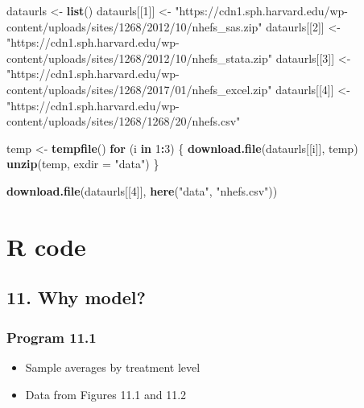 \documentclass[
  10pt,
]{book}
\newenvironment{Shaded}{\begin{snugshade}}{\end{snugshade}}
\newcommand{\ControlFlowTok}[1]{\textcolor[rgb]{0.13,0.29,0.53}{\textbf{#1}}}
\newcommand{\DataTypeTok}[1]{\textcolor[rgb]{0.13,0.29,0.53}{#1}}
\newcommand{\DecValTok}[1]{\textcolor[rgb]{0.00,0.00,0.81}{#1}}
\newcommand{\KeywordTok}[1]{\textcolor[rgb]{0.13,0.29,0.53}{\textbf{#1}}}
\newcommand{\NormalTok}[1]{#1}
\newcommand{\OperatorTok}[1]{\textcolor[rgb]{0.81,0.36,0.00}{\textbf{#1}}}
\newcommand{\StringTok}[1]{\textcolor[rgb]{0.31,0.60,0.02}{#1}}
\providecommand{\tightlist}{%
  \setlength{\itemsep}{0pt}\setlength{\parskip}{0pt}}
\begin{document}
\begin{Shaded}
\begin{Highlighting}[]
\NormalTok{dataurls <-}\StringTok{ }\KeywordTok{list}\NormalTok{()}
\NormalTok{dataurls[[}\DecValTok{1}\NormalTok{]] <-}\StringTok{ "https://cdn1.sph.harvard.edu/wp-content/uploads/sites/1268/2012/10/nhefs_sas.zip"}
\NormalTok{dataurls[[}\DecValTok{2}\NormalTok{]] <-}\StringTok{ "https://cdn1.sph.harvard.edu/wp-content/uploads/sites/1268/2012/10/nhefs_stata.zip"}
\NormalTok{dataurls[[}\DecValTok{3}\NormalTok{]] <-}\StringTok{ "https://cdn1.sph.harvard.edu/wp-content/uploads/sites/1268/2017/01/nhefs_excel.zip"}
\NormalTok{dataurls[[}\DecValTok{4}\NormalTok{]] <-}\StringTok{ "https://cdn1.sph.harvard.edu/wp-content/uploads/sites/1268/1268/20/nhefs.csv"}

\NormalTok{temp <-}\StringTok{ }\KeywordTok{tempfile}\NormalTok{()}
\ControlFlowTok{for}\NormalTok{ (i }\ControlFlowTok{in} \DecValTok{1}\OperatorTok{:}\DecValTok{3}\NormalTok{) \{}
    \KeywordTok{download.file}\NormalTok{(dataurls[[i]], temp)}
    \KeywordTok{unzip}\NormalTok{(temp, }\DataTypeTok{exdir =} \StringTok{"data"}\NormalTok{)}
\NormalTok{\}}

\KeywordTok{download.file}\NormalTok{(dataurls[[}\DecValTok{4}\NormalTok{]], }\KeywordTok{here}\NormalTok{(}\StringTok{"data"}\NormalTok{, }\StringTok{"nhefs.csv"}\NormalTok{))}
\end{Highlighting}
\end{Shaded}

\mainmatter

\hypertarget{part-r-code}{%
\part*{R code}\label{part-r-code}}

\hypertarget{why-model}{%
\chapter*{11. Why model?}\label{why-model}}

\hypertarget{program-11.1}{%
\section{Program 11.1}\label{program-11.1}}

\begin{itemize}
\tightlist
\item
  Sample averages by treatment level
\item
  Data from Figures 11.1 and 11.2
\end{itemize}
\end{document}
